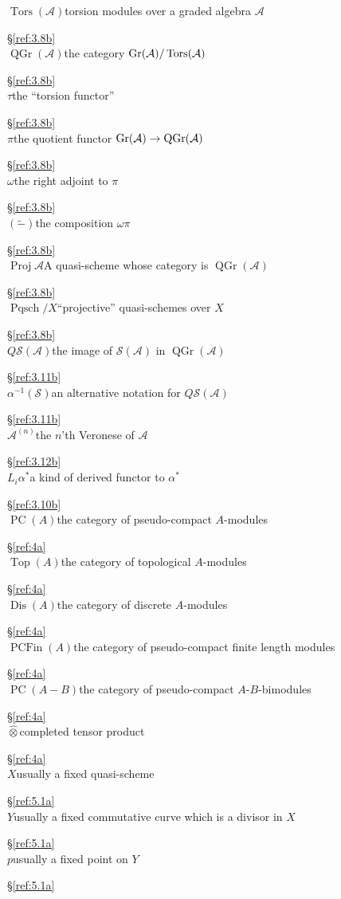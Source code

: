 \documentclass{amsproc}
\def\Ascr{{\mathcal A}}
\def\Sscr{{\mathcal S}}
\DeclareMathOperator{\Dis}{Dis}
\def\ctimes{\mathbin{\hat{\otimes}}}
\def\Gr{\mathop{\text{Gr}}}
\def\Tors{\operatorname{Tors}}
\def\Pqsch{\operatorname {Pqsch}}
\def\Proj{\operatorname {Proj}}
\def\Tors{\operatorname {Tors}}
\def\r{\rightarrow}
\let\oldtext\text
\def\text#1{\oldtext{\upshape #1}}
\DeclareMathOperator{\PC}{PC}
\DeclareMathOperator{\Top}{Top}
\DeclareMathOperator{\PCFin}{PCFin}
\DeclareMathOperator{\QGr}{QGr}
\theoremstyle{definition}
\theoremstyle{remark}
\numberwithin{equation}{section}
\numberwithin{table}{section}
\numberwithin{figure}{section}
\def\Gr{\mathop{\text{Gr}}}
\begin{document}
\begin{tabbing}
$\Tors(\Ascr)$\>torsion modules over a graded algebra $\Ascr$\>\strut\hfill\S\ref{ref:3.8b}\>\\ 
$\QGr(\Ascr)$\>the category
$\Gr(\Ascr)/\Tors(\Ascr)$\>\strut\hfill\S\ref{ref:3.8b}\>\\ 
$\tau$\>the ``torsion functor''\>\strut\hfill\S\ref{ref:3.8b}\>\\ 
$\pi$\>the quotient functor $\Gr(\Ascr)\r\QGr(\Ascr)$\>\strut\hfill\S\ref{ref:3.8b}\>\\
$\omega$\>the right adjoint to $\pi$\>\strut\hfill\S\ref{ref:3.8b}\>\\
$(\tilde{-})$\>the composition $\omega\pi$\>\strut\hfill\S\ref{ref:3.8b}\>\\
$\Proj \Ascr$\>A quasi-scheme whose category is $\QGr(\Ascr)$\>\strut\hfill\S\ref{ref:3.8b}\>\\
$\Pqsch/X$\>``projective'' quasi-schemes over $X$\>\strut\hfill\S\ref{ref:3.8b}\>\\ 
$Q\Sscr(\Ascr)$\>the image of $\Sscr(\Ascr)$ in $\QGr(\Ascr)$\>\strut\hfill\S\ref{ref:3.11b}\>\\ 
$\alpha^{-1}(\Sscr)$\>an alternative notation for
$Q\Sscr(\Ascr)$\>\strut\hfill\S\ref{ref:3.11b}\>\\  
$\Ascr^{(n)}$\>the $n$'th Veronese of $\Ascr$\>\strut\hfill\S\ref{ref:3.12b}\>\\ 
$L_i\alpha^\ast$\>a kind of derived functor to $\alpha^\ast$\>\strut\hfill\S\ref{ref:3.10b}\>\\ 
$\PC(A)$\>the category of pseudo-compact $A$-modules\>\strut\hfill\S\ref{ref:4a}\>\\ 
$\Top(A)$\>the category of topological $A$-modules\>\strut\hfill\S\ref{ref:4a}\>\\ 
$\Dis(A)$\>the category of discrete $A$-modules\>\strut\hfill\S\ref{ref:4a}\>\\ 
$\PCFin(A)$\>the category of pseudo-compact finite length modules\>\strut\hfill\S\ref{ref:4a}\>\\ 
$\PC(A-B)$\>the category of pseudo-compact
$A$-$B$-bimodules\>\strut\hfill\S\ref{ref:4a}\>\\ 
$\ctimes$\>completed tensor product\>\strut\hfill\S\ref{ref:4a}\>\\ 
$X$\>usually a fixed quasi-scheme\>\strut\hfill\S\ref{ref:5.1a}\>\\ 
$Y$\>usually a fixed commutative curve which is a divisor in
$X$\>\strut\hfill\S\ref{ref:5.1a}\>\\ 
$p$\>usually a fixed point on $Y$
\>\strut\hfill\S\ref{ref:5.1a}\>\\

\end{tabbing}
\end{document}
